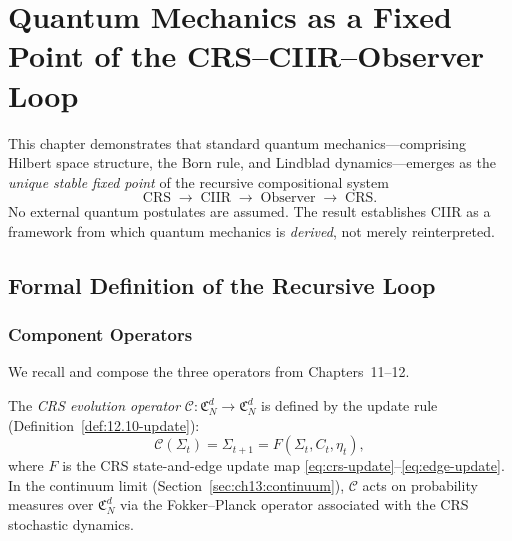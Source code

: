 
\chapter{Quantum Mechanics as a Fixed Point of the CRS--CIIR--Observer Loop}
\label{ch:qm-fixed-point}

\vspace{0.5em}
\noindent
This chapter demonstrates that standard quantum mechanics---comprising
Hilbert space structure, the Born rule, and Lindblad dynamics---emerges
as the \emph{unique stable fixed point} of the recursive compositional
system
\[
  \boxed{\text{CRS} \;\longrightarrow\; \text{CIIR} \;\longrightarrow\;
  \text{Observer} \;\longrightarrow\; \text{CRS}.}
\]
No external quantum postulates are assumed.  The result establishes
CIIR as a framework from which quantum mechanics is \emph{derived},
not merely reinterpreted.

\section{Formal Definition of the Recursive Loop}
\label{sec:ch13:loop}

\subsection{Component Operators}

We recall and compose the three operators from Chapters~11--12.

\begin{definition}\label{def:13.1}
The \emph{CRS evolution operator}
$\mathcal{C} : \mathfrak{C}_N^d \to \mathfrak{C}_N^d$ is defined by
the update rule (Definition~\ref{def:12.10-update}):
\[
  \mathcal{C}(\Sigma_t) = \Sigma_{t+1} = F(\Sigma_t, C_t, \eta_t),
\]
where $F$ is the CRS state-and-edge update map \eqref{eq:crs-update}--\eqref{eq:edge-update}.
In the continuum limit (Section~\ref{sec:ch13:continuum}), $\mathcal{C}$
acts on probability measures over $\mathfrak{C}_N^d$ via the
Fokker--Planck operator associated with the CRS stochastic dynamics.
\end{definition}

